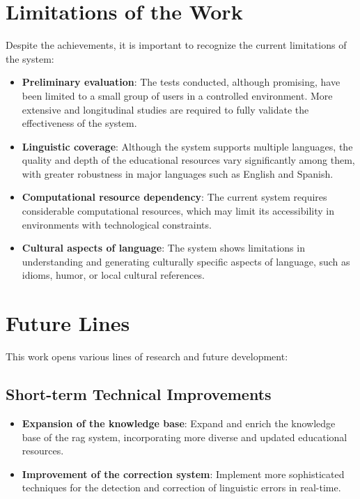 \section{Limitations of the Work}
\label{sec:limitations}

Despite the achievements, it is important to recognize the current limitations of the system:

\begin{itemize}
    \item \textbf{Preliminary evaluation}: The tests conducted, although promising, have been limited to a small group of users in a controlled environment. More extensive and longitudinal studies are required to fully validate the effectiveness of the system.
    
    \item \textbf{Linguistic coverage}: Although the system supports multiple languages, the quality and depth of the educational resources vary significantly among them, with greater robustness in major languages such as English and Spanish.
    
    \item \textbf{Computational resource dependency}: The current system requires considerable computational resources, which may limit its accessibility in environments with technological constraints.
    
    \item \textbf{Cultural aspects of language}: The system shows limitations in understanding and generating culturally specific aspects of language, such as idioms, humor, or local cultural references.
\end{itemize}

\section{Future Lines}
\label{sec:future-lines}

This work opens various lines of research and future development:

\subsection{Short-term Technical Improvements}
\label{subsec:short-term-improvements}

\begin{itemize}
    \item \textbf{Expansion of the knowledge base}: Expand and enrich the knowledge base of the \gls{rag} system, incorporating more diverse and updated educational resources.
    
    \item \textbf{Improvement of the correction system}: Implement more sophisticated techniques for the detection and correction of linguistic errors in real-time.
\end{itemize}

